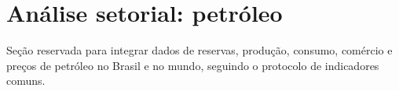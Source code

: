 \section{An\'alise setorial: petr\'oleo}

Se\c{c}\~ao reservada para integrar dados de reservas, produ\c{c}\~ao, consumo, com\'ercio e pre\c{c}os de petr\'oleo no Brasil e no mundo, seguindo o protocolo de indicadores comuns.
